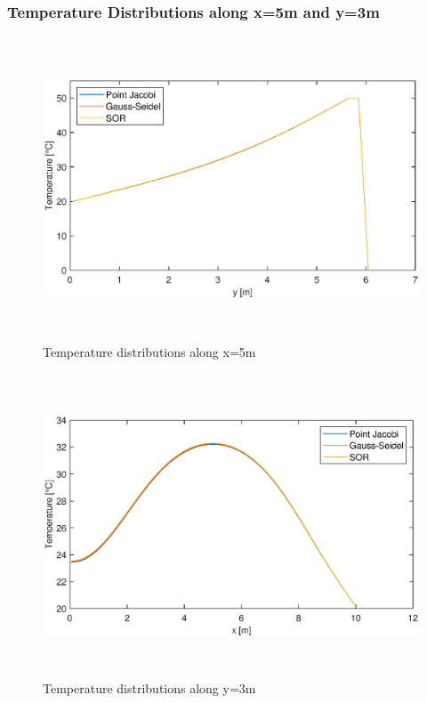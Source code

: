 \documentclass[letterpaper,12pt]{article}
\begin{document}
\subsubsection{Temperature Distributions along x=5m and y=3m}
\begin{figure}[H] 
	\centering 
	\includegraphics[max height=9cm]{graphs/x5_SOR19_defaultrad.eps}
	\caption{Temperature distributions along x=5m}
 	\label{fig:x5rad}
\end{figure}
\begin{figure}[H] 
	\centering 
	\includegraphics[max height=9cm]{graphs/y3_SOR19_defaultrad.eps}
	\caption{Temperature distributions along y=3m}
 	\label{fig:y3rad}
\end{figure}
\end{document}

